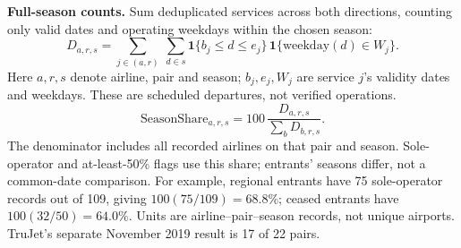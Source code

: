 \begingroup
\renewcommand{\theHequation}{review-o3-season-departures}
\textbf{Full-season counts.} Sum deduplicated services across both directions, counting only valid dates and operating weekdays within the chosen season:
\begin{equation}
D_{a,r,s}=\sum_{j\in(a,r)}\ \sum_{d\in s}
\mathbf{1}\{b_j\leq d\leq e_j\}\,
\mathbf{1}\{\mathrm{weekday}(d)\in W_j\}.
\tag{O3.1}\label{eq:o3-season-departures}
\end{equation}
Here $a,r,s$ denote airline, pair and season; $b_j,e_j,W_j$ are service $j$'s validity dates and weekdays. These are scheduled departures, not verified operations.
\renewcommand{\theHequation}{review-o3-season-share}
\begin{equation}
\mathrm{SeasonShare}_{a,r,s}=100\,
\frac{D_{a,r,s}}{\sum_b D_{b,r,s}}.
\tag{O3.2}\label{eq:o3-season-share}
\end{equation}
The denominator includes all recorded airlines on that pair and season. Sole-operator and at-least-50\% flags use this share; entrants' seasons differ, not a common-date comparison. For example, regional entrants have 75 sole-operator records out of 109, giving $100(75/109)=68.8\%$; ceased entrants have $100(32/50)=64.0\%$. Units are airline--pair--season records, not unique airports. TruJet's separate November 2019 result is 17 of 22 pairs.
\endgroup
\par
